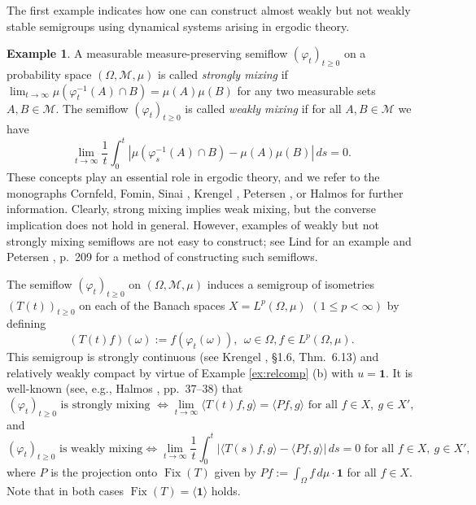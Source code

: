 \documentclass[11pt,intlimits, draft,oneside]{amsart}
\theoremstyle{definition}
\newtheorem{example}[thm]{Example}
\newcommand\Eins{\mathbf{1}}
\def\Fix{\mathop{\mathrm{Fix}}}
\def\dd{\,d}
\begin{document}
The first example indicates how one can construct almost weakly but
not weakly stable semigroups using dynamical systems arising in
ergodic theory.


%
\begin{example} \label{ergodic theory}
A measurable measure-preserving semiflow $(\varphi_t)_{t \geq 0}$ on
a probability space \linebreak $(\Omega,\mathcal M,\mu)$ is called
\emph{strongly mixing} if $\displaystyle \lim_{t\to\infty} \mu(
\varphi_t^{-1}(A) \cap B) = \mu(A)\mu(B)$ for any two measurable
sets $A,B \in \mathcal M$. The semiflow $(\varphi_t)_{t \geq 0}$ is
called \emph{weakly mixing} if for all $A,B \in \mathcal M$ we have
%
\begin{equation*} \lim_{t\to \infty} \frac{1}{t} \int_0^t |\mu(\varphi_s^{-1}(A)
\cap B) - \mu(A)\mu(B)| \dd s = 0.\end{equation*}
%
These concepts play an essential role in ergodic theory, and we
refer to the monographs Cornfeld, Fomin, Sinai
\cite{cornfeld/fomin/sinai:1982}, Krengel \cite{krengel:1985},
Petersen \cite{petersen:1983}, or Halmos \cite{halmos:1956} for
further information. Clearly, strong mixing implies weak mixing, but
the converse implication does not hold in general. However, examples
of weakly but not strongly mixing semiflows are not easy to
construct; see Lind \cite{lind75} for an example and Petersen
\cite{petersen:1983}, p.~209 for a method of constructing such
semiflows.

The semiflow $(\varphi_t)_{t\geq 0}$ on $(\Omega,\mathcal M,\mu)$
induces a semigroup of isometries $(T(t))_{t\geq 0}$ on each of the
Banach spaces $X=L^p(\Omega,\mu)$ $(1\leq p < \infty)$ by defining
%
\begin{equation*}
(T(t)f)(\omega) := f(\varphi_t(\omega)),\ \ \omega \in \Omega, f \in
L^p(\Omega,\mu).
\end{equation*}
%
This semigroup is strongly continuous (see Krengel
\cite{krengel:1985}, {\S}1.6, Thm.~6.13) and relatively weakly compact
by virtue of Example \ref{ex:relcomp} (b) with $u=\Eins$. It is
well-known (see, e.g., Halmos \cite{halmos:1956}, pp.~37--38) that
%
\begin{equation*}
(\varphi_t)_{t\geq 0} \text{ is strongly mixing  }
 \Longleftrightarrow
\lim_{t\to\infty} \langle T(t)f,g \rangle = \langle P f,g \rangle
\text{  for all  } f\in X, \ g\in X',
\end{equation*}
%
and
\begin{equation*}
(\varphi_t)_{t\geq 0} \text{ is weakly mixing} \Longleftrightarrow
 \lim_{t\to\infty} \frac{1}{t}\int_0^t |\langle
T(s)f,g\rangle - \langle Pf,g\rangle|\dd s =0 \text{   for all }
f\in X,\ g\in X',
\end{equation*}
where $P$ is the projection onto $\Fix(T)$ given by $Pf:=\int_\Omega
f \dd\mu\cdot \Eins$ for all $f\in X$. Note that in both cases
$\Fix(T)=\langle \Eins \rangle$ holds.



\end{example}
\end{document}
